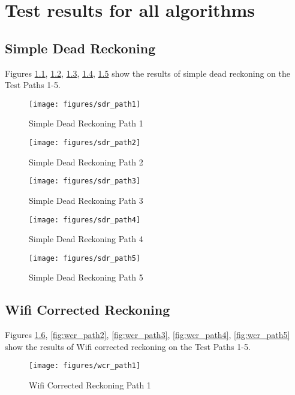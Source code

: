 \chapter{Test results for all algorithms}

\section{Simple Dead Reckoning}

Figures \ref{fig:sdr_path1}, \ref{fig:sdr_path2}, \ref{fig:sdr_path3}, \ref{fig:sdr_path4}, \ref{fig:sdr_path5}
show the results of simple dead reckoning on the Test Paths 1-5.

\begin{figure}
    \centering
    \texttt{[image: figures/sdr\_path1]}
    \caption{Simple Dead Reckoning Path 1\label{fig:sdr_path1}}
\end{figure}

\begin{figure}
    \centering
    \texttt{[image: figures/sdr\_path2]}
    \caption{Simple Dead Reckoning Path 2\label{fig:sdr_path2}}
\end{figure}

\begin{figure}
    \centering
    \texttt{[image: figures/sdr\_path3]}
    \caption{Simple Dead Reckoning Path 3\label{fig:sdr_path3}}
\end{figure}

\begin{figure}
    \centering
    \texttt{[image: figures/sdr\_path4]}
    \caption{Simple Dead Reckoning Path 4\label{fig:sdr_path4}}
\end{figure}

\begin{figure}
    \centering
    \texttt{[image: figures/sdr\_path5]}
    \caption{Simple Dead Reckoning Path 5\label{fig:sdr_path5}}
\end{figure}

\section{Wifi Corrected Reckoning}

Figures \ref{fig:wcr_path1}, \ref{fig:wcr_path2}, \ref{fig:wcr_path3}, \ref{fig:wcr_path4}, \ref{fig:wcr_path5}
show the results of Wifi corrected reckoning on the Test Paths 1-5.


\begin{figure}
    \centering
    \texttt{[image: figures/wcr\_path1]}
    \caption{Wifi Corrected Reckoning Path 1\label{fig:wcr_path1}}
\end{figure}

